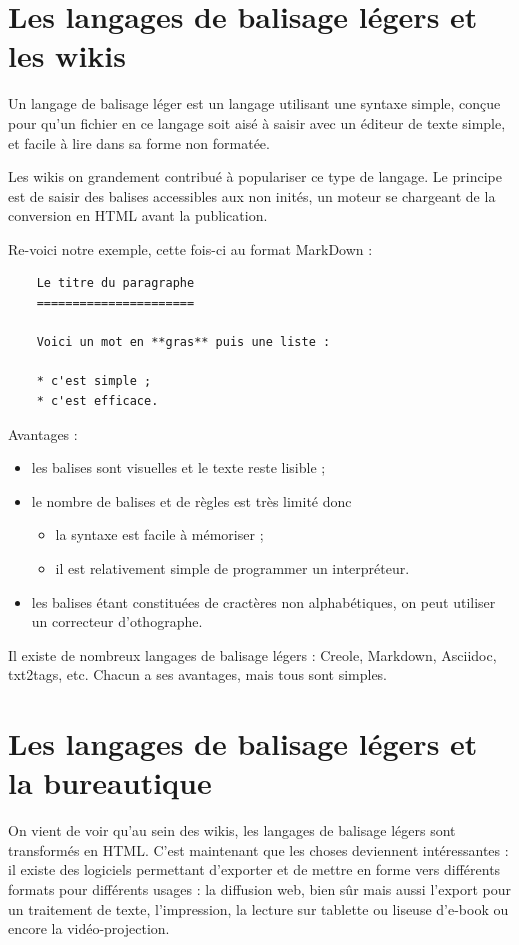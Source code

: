 \documentclass[]{article}
\begin{document}
\section{Les langages de balisage légers et les wikis}

Un langage de balisage léger est un langage utilisant une syntaxe
simple, conçue pour qu'un fichier en ce langage soit aisé à saisir avec
un éditeur de texte simple, et facile à lire dans sa forme non formatée.

Les wikis on grandement contribué à populariser ce type de langage. Le
principe est de saisir des balises accessibles aux non inités, un moteur
se chargeant de la conversion en HTML avant la publication.

Re-voici notre exemple, cette fois-ci au format MarkDown :

\begin{verbatim}
    Le titre du paragraphe
    ======================

    Voici un mot en **gras** puis une liste :

    * c'est simple ;
    * c'est efficace.
\end{verbatim}
Avantages :

\begin{itemize}
\item
  les balises sont visuelles et le texte reste lisible ;
\item
  le nombre de balises et de règles est très limité donc
  \begin{itemize}
  \item
    la syntaxe est facile à mémoriser ;
  \item
    il est relativement simple de programmer un interpréteur.
  \end{itemize}
\item
  les balises étant constituées de cractères non alphabétiques, on peut
  utiliser un correcteur d'othographe.
\end{itemize}
Il existe de nombreux langages de balisage légers : Creole, Markdown,
Asciidoc, txt2tags, etc. Chacun a ses avantages, mais tous sont simples.

\section{Les langages de balisage légers et la bureautique}

On vient de voir qu'au sein des wikis, les langages de balisage légers
sont transformés en HTML. C'est maintenant que les choses deviennent
intéressantes : il existe des logiciels permettant d'exporter et de
mettre en forme vers différents formats pour différents usages : la
diffusion web, bien sûr mais aussi l'export pour un traitement de texte,
l'impression, la lecture sur tablette ou liseuse d'e-book ou encore la
vidéo-projection.
\end{document}
